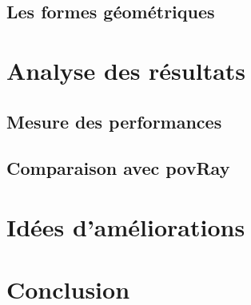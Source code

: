 \documentclass[11pt]{article}
\begin{document}
    \subsection{Les formes géométriques}




\section{Analyse des résultats}
    \subsection{Mesure des performances}
        

    \subsection{Comparaison avec povRay}
\section{Idées d'améliorations}
    
\section{Conclusion}






\newpage%


\newpage%
\nocite{*}


\end{document}
